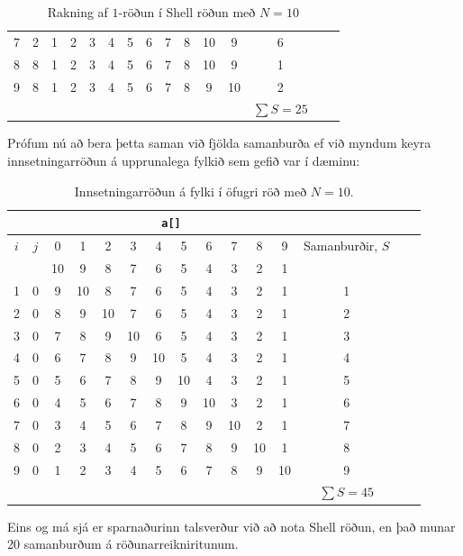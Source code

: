 \documentclass[12pt, a4paper, hidelinks]{article}
\begin{document}
\begin{table}[ht!]
\begin{tabular}[pos]{cc|ccccccccccccc}
    7   & 2   & \color{lightgray} 1 & \color{lightgray}  2 & \color{red} 3 & 4 & 5 & 6 & 7 & 8 & \color{lightgray} 10 & \color{lightgray} 9 & 6 \\
    8   & 8   & \color{lightgray} 1 & \color{lightgray} 2 & \color{lightgray} 3 & \color{lightgray} 4 & \color{lightgray} 5 & \color{lightgray} 6 & \color{lightgray} 7 & \color{lightgray}  8 & \color{red} 10 & \color{lightgray} 9 & 1\\
    9   & 8   & \color{lightgray} 1 & \color{lightgray} 2 & \color{lightgray} 3 & \color{lightgray} 4 & \color{lightgray} 5 & \color{lightgray} 6 & \color{lightgray} 7 & \color{lightgray}  8 & \color{red} 9 & 10 & 2 \\
    \midrule
    \multicolumn{12}{c}{} & $\sum S = 25$ \\
    \bottomrule
    \end{tabular}
    \caption{Rakning af $1$-röðun í Shell röðun með $N = 10$}
\end{table}
\noindent
Prófum nú að bera þetta saman við fjölda samanburða ef við myndum keyra innsetningarröðun á upprunalega fylkið
sem gefið var í dæminu:

\newcommand{\g}{\color{lightgray}}
\newcommand{\curr}{\color{red}}
\begin{table}[ht!]
    \centering
    \begin{tabular}[pos]{cc|ccccccccccccc}
    \multicolumn{2}{c}{} & \multicolumn{10}{c}{\texttt{a[]}} \\
    \toprule
    $i$ & $j$ & 0 & 1 & 2 & 3 & 4 & 5 & 6 & 7 & 8  & 9 & Samanburðir, $S$ \\
    \midrule
        &     & 10 & 9 & 8 & 7 & 6 & 5 & 4 & 3 & 2 & 1 \\
    1   & 0   & \curr 9 & 10 & \g 8 & \g 7 & \g 6 & \g 5 & \g 4 & \g 3 & \g 2 & \g 1 & 1 \\
    2   & 0   & \curr 8 & 9  & 10 & \g 7 & \g 6 & \g 5 & \g 4 & \g 3 & \g 2 & \g 1 & 2 \\ 
    3   & 0   & \curr 7 & 8  & 9  & 10 & \g 6 & \g 5 & \g 4 & \g 3 & \g 2 & \g 1 & 3\\ 
    4   & 0   & \curr 6 & 7  & 8  & 9  & 10 & \g 5 & \g 4 & \g 3 & \g 2 & \g 1 & 4\\
    5   & 0   & \curr 5 & 6  & 7  & 8  & 9  & 10 & \g 4 & \g 3 & \g 2 & \g 1 & 5 \\
    6   & 0   & \curr 4 & 5 & 6 & 7 & 8 & 9 & 10 & \g 3 & \g 2 & \g 1 & 6 \\
    7   & 0   & \curr 3 & 4 & 5 & 6 & 7 & 8 & 9 & 10 & \g 2 & \g 1 & 7 \\
    8   & 0   & \curr 2 & 3 & 4 & 5 & 6 & 7 & 8 & 9 & 10 & \g 1 & 8 \\
    9   & 0   & \curr 1 & 2 & 3 & 4 & 5 & 6 & 7 & 8 & 9 & 10 & 9 \\
    \midrule
    \multicolumn{12}{c}{} & $\sum S = 45$ \\
    \bottomrule
    \end{tabular}
    \caption{Innsetningarröðun á fylki í öfugri röð með $N = 10$.}
\end{table}
\noindent
Eins og má sjá er sparnaðurinn talsverður við að nota Shell röðun, en það munar 20 samanburðum
á röðunarreikniritunum.
\end{document}
